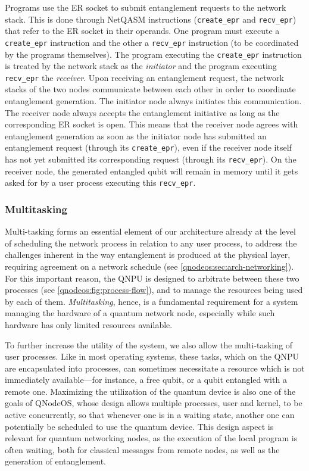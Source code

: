 Programs use the \ac{ER} socket to submit entanglement requests to the network stack. This is done through NetQASM instructions (\texttt{create\_epr} and \texttt{recv\_epr}) that refer to the \ac{ER} socket in their operands. One program must execute a \texttt{create\_epr} instruction and the other a \texttt{recv\_epr} instruction (to be coordinated by the programs themselves). The program executing the \texttt{create\_epr} instruction is treated by the network stack as the \emph{initiator} and the program executing \texttt{recv\_epr} the \emph{receiver}. 
Upon receiving an entanglement request, the network stacks of the two nodes communicate between each other in order to coordinate entanglement generation. The initiator node always initiates this communication. The receiver node always accepts the entanglement initiative as long as the corresponding \ac{ER} socket is open. This means that the receiver node agrees with entanglement generation as soon as the initiator node has submitted an entanglement request (through its \texttt{create\_epr}), even if the receiver node itself has not yet submitted its corresponding request (through its \texttt{recv\_epr}). On the receiver node, the generated entangled qubit will remain in memory until it gets asked for by a user process executing this \texttt{recv\_epr}.

\subsubsection{Multitasking}

Multi-tasking forms an essential element of our architecture already at the level of scheduling the network process in relation to any user process, to address the challenges inherent in the way entanglement is produced at the physical layer, requiring agreement on a network schedule (see \cref{qnodeos:sec:arch-networking}). For this important reason, the \ac{QNPU} is designed to arbitrate between these two processes (see \cref{qnodeos:fig:process-flow}), and to manage the resources being used by each of them. \emph{Multitasking}, hence, is a fundamental requirement for a system managing the hardware of a quantum network node, especially while such hardware has only limited resources available. 

To further increase the utility of the system, we also allow the multi-tasking of user processes.
Like in most operating systems, these tasks, which on the \ac{QNPU} are encapsulated into processes, can sometimes necessitate a resource which is not immediately available---for instance, a free qubit, or a qubit entangled with a remote one. Maximizing the utilization of the quantum device is also one of the goals of \ac{QNodeOS}, whose design allows multiple processes, user and kernel, to be active concurrently, so that whenever one is in a waiting state, another one can potentially be scheduled to use the quantum device.  This design aspect is relevant for quantum networking nodes, as the execution of the local program is often waiting, both for classical messages from remote nodes, as well as the generation of entanglement. 


